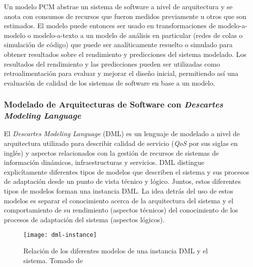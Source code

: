 Un modelo PCM abstrae un sistema de software a nivel de arquitectura y se anota con consumos de recursos que fueron medidos previamente u otros que son estimados. El modelo puede entonces ser usado en transformaciones de modelo-a-modelo o modelo-a-texto a un modelo de análisis en particular (redes de colas o simulación de código) que puede ser analíticamente resuelto o simulado para obtener resultados sobre el rendimiento y predicciones del sistema modelado. Los resultados del rendimiento y las predicciones pueden ser utilizadas como retroalimentación para evaluar y mejorar el diseño inicial, permitiendo así una evaluación de calidad de los sistemas de software en base a un modelo\cite{Noorshams2015_1000046750}.


\subsubsection{Modelado de Arquitecturas de Software con \emph{Descartes Modeling Language}} 
El \emph{Descartes Modeling Language} (DML) es un lenguaje de modelado a nivel de arquitectura utilizado para describir calidad de servicio (\emph{QoS} por sus siglas en inglés) y aspectos relacionados con la gestión de recursos de sistemas de información dinámicos, infraestructuras y servicios. DML distingue explicítamente diferentes tipos de modelos que describen el sistema y sus procesos de adaptación desde un punto de vista técnico y lógico. Juntos, estos diferentes tipos de modelos forman una instancia DML. La idea detrás del uso de estos modelos es separar el conocimiento acerca de la arquitectura del sistema y el comportamiento de su rendimiento (aspectos técnicos) del conocimiento de los procesos de adaptación del sistema (aspectos lógicos)\cite{KoBrHu2014-TechReport-DML}.

\begin{figure}[h]
  \centering
  \texttt{[image: dml-instance]}
  \caption[Relación de los diferentes modelos de una instancia DML y el sistema]{Relación de los diferentes modelos de una instancia DML y el sistema. Tomado de \protect\cite{KoBrHu2014-TechReport-DML}}
  \label{fig:dml-instance}
\end{figure}

